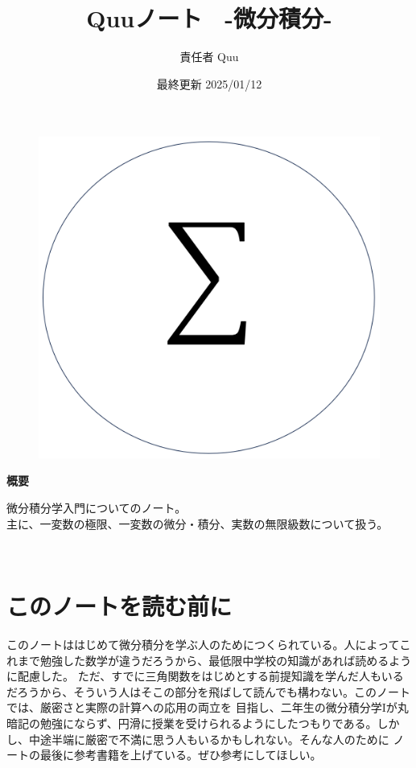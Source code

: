 \documentclass[a4j,dvipdfmx]{jsarticle}
\title{Quuノート　-微分積分\ajRoman{1}-}
\date{最終更新 2025/01/12}
\author{責任者 Quu}
\begin{document}
    \maketitle
    \thispagestyle{empty}
    \begin{figure}[h]
        \centering
        \includegraphics[scale=0.5]{img/QuuNote/icon.png}
    \end{figure}
    
    \centerline{\textbf{概要}}
    \noindent
    微分積分学入門についてのノート。\\
    主に、一変数の極限、一変数の微分・積分、実数の無限級数について扱う。
    
    \clearpage
    　
    \clearpage
    \part*{このノートを読む前に}
        このノートははじめて微分積分を学ぶ人のためにつくられている。人によってこれまで勉強した数学が違うだろうから、最低限中学校の知識があれば読めるように配慮した。
        ただ、すでに三角関数をはじめとする前提知識を学んだ人もいるだろうから、そういう人はそこの部分を飛ばして読んでも構わない。このノートでは、厳密さと実際の計算への応用の両立を
        目指し、二年生の微分積分学Iが丸暗記の勉強にならず、円滑に授業を受けられるようにしたつもりである。しかし、中途半端に厳密で不満に思う人もいるかもしれない。そんな人のために
        ノートの最後に参考書籍を上げている。ぜひ参考にしてほしい。
\end{document}

